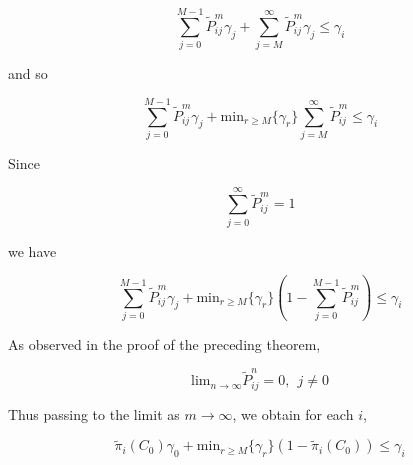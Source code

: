 \documentclass[12pt]{article}
\theoremstyle{nonumberbreak}
\begin{document}
$$
\sum_{j=0}^{M-1} \tilde{P}_{ij}^m \gamma_j + \sum_{j=M}^\infty \tilde{P}_{ij}^m \gamma_j \le \gamma_i
$$

and so

$$
\sum_{j=0}^{M-1} \tilde{P}_{ij}^m \gamma_j + \mathrm{min}_{r \ge M} \{ \gamma_r \} \sum_{j=M}^\infty \tilde{P}_{ij}^m \le \gamma_i
$$


Since 

$$
\sum_{j=0}^\infty \tilde{P}_{ij}^m = 1
$$

we have

$$
\sum_{j=0}^{M-1} \tilde{P}_{ij}^m \gamma_j + \mathrm{min}_{r \ge M} \{ \gamma_r \} \left( 1 - \sum_{j=0}^{M-1} \tilde{P}_{ij}^m \right) \le \gamma_i
$$


As observed in the proof of the preceding theorem, 

$$
\mathrm{lim}_{n\to\infty} \tilde{P}^n_{ij} = 0, \ \ j\neq 0
$$

Thus passing to the limit as $m \to \infty $, we obtain for each $i$,

$$
\tilde{\pi}_i (C_0)\gamma_0 + \mathrm{min}_{r \ge M} \{ \gamma_r \} (1 - \tilde{\pi}_i (C_0)) \le \gamma_i
$$
\end{document}
